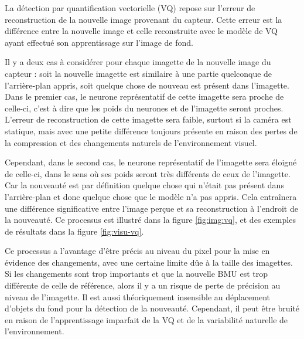 	La détection par quantification vectorielle (VQ) repose sur l'erreur de reconstruction de la nouvelle image provenant du capteur. Cette erreur est la différence entre la nouvelle image et celle reconstruite avec le modèle de VQ ayant effectué son apprentissage sur l'image de fond.

	Il y a deux cas à considérer pour chaque imagette de la nouvelle image du capteur : soit la nouvelle imagette est similaire à une partie quelconque de l'arrière-plan appris, soit quelque chose de nouveau est présent dans l'imagette. Dans le premier cas, le neurone représentatif de cette imagette sera proche de celle-ci, c'est à dire que les poids du neurones et de l'imagette seront proches. L'erreur de reconstruction de cette imagette sera faible, surtout si la caméra est statique, mais avec une petite différence toujours présente en raison des pertes de la compression et des changements naturels de l'environnement visuel.
	
	Cependant, dans le second cas, le neurone représentatif de l'imagette sera éloigné de celle-ci, dans le sens où ses poids seront très différents de ceux de l'imagette. Car la nouveauté est par définition quelque chose qui n'était pas présent dans l'arrière-plan et donc quelque chose que le modèle n'a pas appris. Cela entraînera une différence significative entre l'image perçue et sa reconstruction à l'endroit de la nouveauté. Ce processus est illustré dans la figure \ref{fig:img:vq}, et des exemples de résultats dans la figure \ref{fig:visu-vq}. 

	Ce processus a l'avantage d'être précis au niveau du pixel pour la mise en évidence des changements, avec une certaine limite dûe à la taille des imagettes. Si les changements sont trop importants et que la nouvelle BMU est trop différente de celle de référence, alors il y a un risque de perte de précision au niveau de l'imagette. Il est aussi théoriquement insensible au déplacement d'objets du fond pour la détection de la nouveauté. Cependant, il peut être bruité en raison de l'apprentissage imparfait de la VQ et de la variabilité naturelle de l'environnement.

